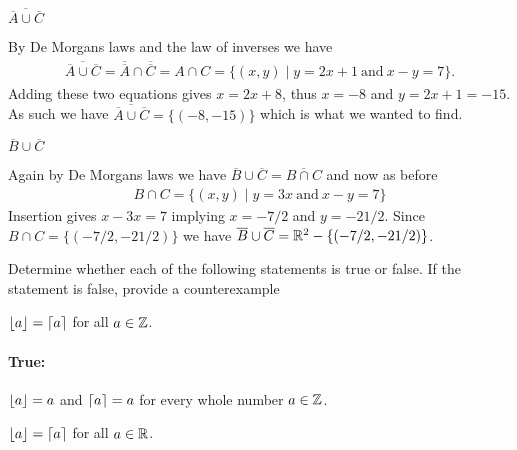 \documentclass[a4paper, english, 12pt]{article} %
\begin{document}
\begin{subproblem}[3]
  $\overline{\overline{A} \cup \overline{C}}$
\end{subproblem}

\begin{answer}
  By De Morgans laws and the law of inverses we have
  \begin{align*}
      \overline{\overline{A} \cup \overline{C}}
    = \overline{\overline{A}} \cap \overline{\overline{C}}
    = A \cap C 
    = \{(x,y) \mid y = 2x + 1 \ \text{and} \ x - y  = 7 \}.
  \end{align*}
  Adding these two equations gives $x = 2x + 8$, thus $x=-8$ and $y=2x+1=-15$.
  As such we have $\overline{\overline{A} \cup \overline{C}} = \{(-8, -15)\}$
  which is what we wanted to find.
\end{answer}

\begin{subproblem}
  $\overline{B} \cup \overline{C}$
\end{subproblem}

\begin{answer}
  Again by De Morgans laws we have
  $\overline{B} \cup \overline{C} = \overline{B \cap C}$ and now as before
  \begin{align*}
    B \cap C = \{(x,y) \mid y = 3x \ \text{and} \ x - y = 7\}
  \end{align*}
  Insertion gives $x - 3x=7$ implying $x=-7/2$ and $y=-21/2$. Since $B \cap C =
  \{(-7/2,-21/2)\}$
  we have $\overline{B} \cup \overline{C} = \mathbb{R}^2 - \{(-7/2,-21/2)\}$.
\end{answer}

\begin{problem}[8]
  Determine whether each of the following statements is true or false. If the
  statement is false, provide a counterexample
\end{problem}

\begin{subproblem}
  $\lfloor a\rfloor = \lceil a\rceil$ for all $a \in \mathbb{Z}$.
\end{subproblem}

\begin{answer}
  \paragraph{True:} $\lfloor a\rfloor = a$ and $\lceil a\rceil = a$ for every whole number $a
  \in \mathbb{Z}$.
\end{answer}

\begin{subproblem}
  $\lfloor a\rfloor = \lceil a\rceil$ for all $a \in \mathbb{R}$.
\end{subproblem}
\end{document}
